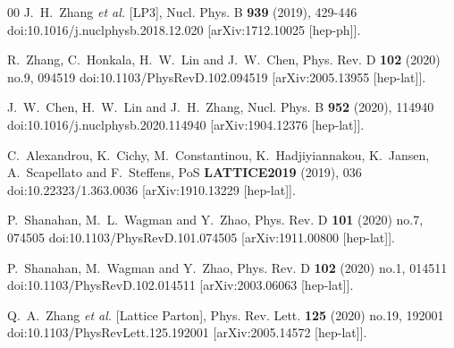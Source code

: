\documentclass[preprint,12pt]{elsarticle}
\begin{document}
\begin{thebibliography}{00}
J.~H.~Zhang \textit{et al.} [LP3],
Nucl. Phys. B \textbf{939} (2019), 429-446
doi:10.1016/j.nuclphysb.2018.12.020
[arXiv:1712.10025 [hep-ph]].

R.~Zhang, C.~Honkala, H.~W.~Lin and J.~W.~Chen,
Phys. Rev. D \textbf{102} (2020) no.9, 094519
doi:10.1103/PhysRevD.102.094519
[arXiv:2005.13955 [hep-lat]].

J.~W.~Chen, H.~W.~Lin and J.~H.~Zhang,
Nucl. Phys. B \textbf{952} (2020), 114940
doi:10.1016/j.nuclphysb.2020.114940
[arXiv:1904.12376 [hep-lat]].

C.~Alexandrou, K.~Cichy, M.~Constantinou, K.~Hadjiyiannakou, K.~Jansen, A.~Scapellato and F.~Steffens,
PoS \textbf{LATTICE2019} (2019), 036
doi:10.22323/1.363.0036
[arXiv:1910.13229 [hep-lat]].

P.~Shanahan, M.~L.~Wagman and Y.~Zhao,
Phys. Rev. D \textbf{101} (2020) no.7, 074505
doi:10.1103/PhysRevD.101.074505
[arXiv:1911.00800 [hep-lat]].

P.~Shanahan, M.~Wagman and Y.~Zhao,
Phys. Rev. D \textbf{102} (2020) no.1, 014511
doi:10.1103/PhysRevD.102.014511
[arXiv:2003.06063 [hep-lat]].

Q.~A.~Zhang \textit{et al.} [Lattice Parton],
Phys. Rev. Lett. \textbf{125} (2020) no.19, 192001
doi:10.1103/PhysRevLett.125.192001
[arXiv:2005.14572 [hep-lat]].


\end{thebibliography}
\end{document}
